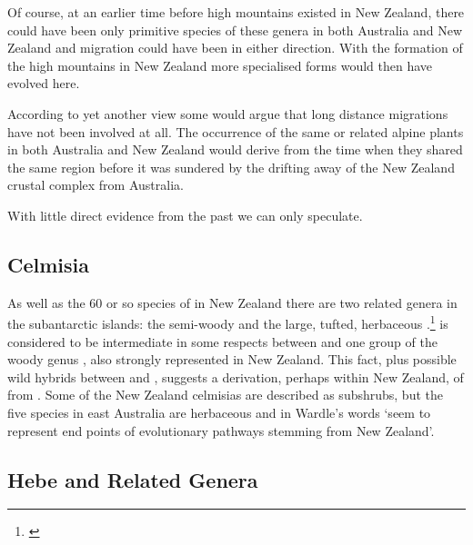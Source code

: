 Of course, at an earlier time before high mountains existed in New Zealand, there could have been only primitive species of these genera in both Australia and New Zealand and migration could have been in either direction.
With the formation of the high mountains in New Zealand more specialised forms would then have evolved here.

According to yet another view some would argue that long distance migrations have not been involved at all.
The occurrence of the same or related alpine plants in both Australia and New Zealand would derive from the time when they shared the same region before it was sundered by the drifting away of the New Zealand crustal complex from Australia.

With little direct evidence from the past we can only speculate.

\subsection{Celmisia}

As well as the 60 or so species of  in New Zealand there are two related genera in the subantarctic islands: the semi-woody  and the large, tufted, herbaceous .\footnote{\cite{given1973damnamenia}}
 is considered to be intermediate in some respects between  and one group of the woody genus , also strongly represented in New Zealand.
This fact, plus possible wild hybrids between  and , suggests a derivation, perhaps within New Zealand, of  from .
Some of the New Zealand celmisias are described as subshrubs, but the five species in east Australia are herbaceous and in Wardle's words `seem to represent end points of evolutionary pathways stemming from New Zealand'.

\subsection{Hebe and Related Genera}

